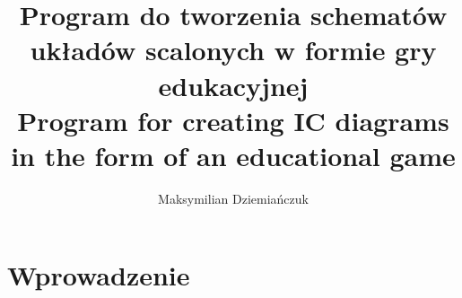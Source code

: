 \documentclass[11pt]{report}
\title{\textbf{Program do tworzenia schematów układów scalonych w formie gry edukacyjnej}\\[2ex]
    \large Program for creating IC diagrams in the form of an educational game\\
}
\author{Maksymilian Dziemiańczuk}
\date{}
\begin{document}
\maketitle

\tableofcontents

\chapter{Wprowadzenie}



    
    
\end{document}
